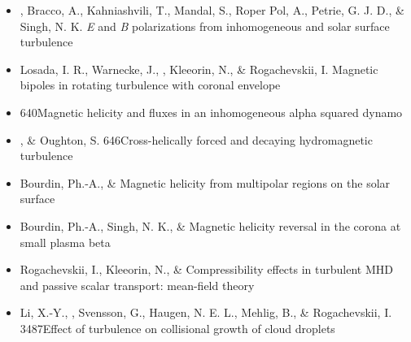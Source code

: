 \begin{itemize}
\item[{380.}~]
\Brandenburg, Bracco, A., Kahniashvili, T., Mandal, S., Roper Pol, A., Petrie, G. J. D., \& Singh, N. K.
{{\em E} and {\em B} polarizations from inhomogeneous and solar surface turbulence}

\item[{379.}~]
Losada, I. R., Warnecke, J., \Brandenburg, Kleeorin, N., \& Rogachevskii, I.
{Magnetic bipoles in rotating turbulence with coronal envelope}

\item[{378.}~]
\Brandenburg{}
{640}{Magnetic helicity and fluxes in an inhomogeneous alpha squared dynamo}

\item[{377.}~]
\Brandenburg, \& Oughton, S.
{646}{Cross-helically forced and decaying hydromagnetic turbulence}

\item[{376.}~]
Bourdin, Ph.-A., \& \Brandenburg{}
{Magnetic helicity from multipolar regions on the solar surface}

\item[{375.}~]
Bourdin, Ph.-A., Singh, N. K., \& \Brandenburg{}
{Magnetic helicity reversal in the corona at small plasma beta}

\item[{374.}~]
Rogachevskii, I., Kleeorin, N., \& \Brandenburg{}
{Compressibility effects in turbulent MHD and passive scalar transport: mean-field theory}

\item[{373.}~]
Li, X.-Y., \Brandenburg, Svensson, G., Haugen, N. E. L., Mehlig, B., \& Rogachevskii, I.
{3487}{Effect of turbulence on collisional growth of cloud droplets}


\end{itemize}
